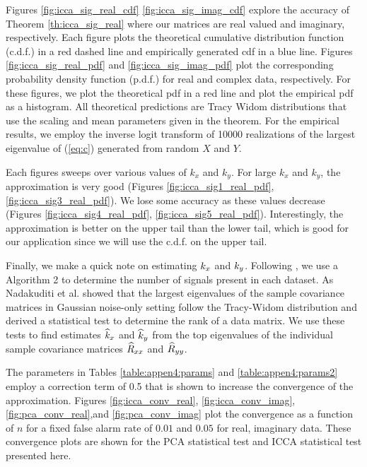 
Figures \ref{fig:icca_sig_real_cdf} \ref{fig:icca_sig_imag_cdf} explore the accuracy of
Theorem \ref{th:icca_sig_real} where our matrices are real valued and imaginary,
respectively. Each figure plots the theoretical cumulative distribution function (c.d.f.)
in a red dashed line and empirically generated cdf in a blue line. Figures
\ref{fig:icca_sig_real_pdf} and \ref{fig:icca_sig_imag_pdf} plot the corresponding
probability density function (p.d.f.) for real and complex data, respectively. For these
figures, we plot the theoretical pdf in a red line and plot the empirical pdf as a
histogram. All theoretical predictions are Tracy Widom distributions that use the scaling
and mean parameters given in the theorem. For the empirical results, we employ the inverse
logit transform of 10000 realizations of the largest eigenvalue of (\ref{eq:c}) generated
from random $X$ and $Y$.

Each figures sweeps over various values of $k_x$ and $k_y$. For large $k_x$ and $k_y$, the
approximation is very good (Figures \ref{fig:icca_sig1_real_pdf},
\ref{fig:icca_sig3_real_pdf}). We lose some accuracy as these values decrease (Figures
\ref{fig:icca_sig4_real_pdf}, \ref{fig:icca_sig5_real_pdf}). Interestingly, the
approximation is better on the upper tail than the lower tail, which is good for our
application since we will use the c.d.f. on the upper tail.

Finally, we make a quick note on estimating $k_x$ and $k_y$. Following
\cite{nadakuditi2008sample}, we use a Algorithm 2 to determine the number of signals
present in each dataset. As Nadakuditi et al. showed that the largest eigenvalues of the
sample covariance matrices in Gaussian noise-only setting follow the Tracy-Widom
distribution and derived a statistical test to determine the rank of a data
matrix. We use these tests to find estimates $\widehat{k}_x$ and $\widehat{k}_y$ from the
top eigenvalues of the individual sample covariance matrices $\widehat{R}_{xx}$ and $\widehat{R}_{yy}$. 

The parameters in Tables \ref{table:appen4:params} and \ref{table:appen4:params2} employ a
correction term of 0.5 that is shown to increase the convergence of the
approximation. Figures \ref{fig:icca_conv_real}, \ref{fig:icca_conv_imag},
\ref{fig:pca_conv_real},and \ref{fig:pca_conv_imag} plot the convergence as a function of
$n$ for a fixed false alarm rate of $0.01$ and $0.05$ for real, imaginary data. These
convergence plots are shown for the PCA statistical test \cite{nadakuditi2008sample} and
ICCA statistical test presented here.

